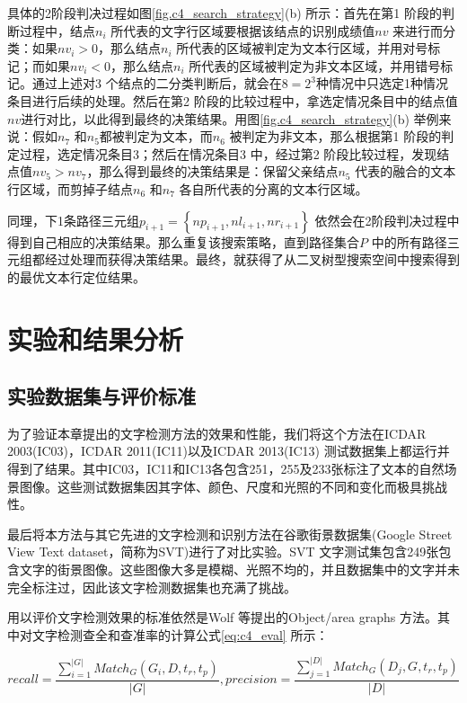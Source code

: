         具体的2阶段判决过程如图\ref{fig.c4_search_strategy}(b) 所示：首先在第1 阶段的判断过程中，结点$n_i$ 所代表的文字行区域要根据该结点的识别成绩值$nv$ 来进行而分类：如果$nv_i>0$，那么结点$n_i$ 所代表的区域被判定为文本行区域，并用对号标记；而如果$nv_i<0$，那么结点$n_i$ 所代表的区域被判定为非文本区域，并用错号标记。通过上述对3 个结点的二分类判断后，就会在$8=2^3$种情况中只选定1种情况条目进行后续的处理。然后在第2 阶段的比较过程中，拿选定情况条目中的结点值$nv$进行对比，以此得到最终的决策结果。用图\ref{fig.c4_search_strategy}(b) 举例来说：假如$n_7$ 和$n_5$都被判定为文本，而$n_6$ 被判定为非文本，那么根据第1 阶段的判定过程，选定情况条目3；然后在情况条目3 中，经过第2 阶段比较过程，发现结点值$nv_5>nv_7$，那么得到最终的决策结果是：保留父亲结点$n_5$ 代表的融合的文本行区域，而剪掉子结点$n_6$ 和$n_7$ 各自所代表的分离的文本行区域。

        同理，下1条路径三元组$p_{i+1}=\left\{np_{i+1},nl_{i+1},nr_{i+1}\right\}$ 依然会在2阶段判决过程中得到自己相应的决策结果。那么重复该搜索策略，直到路径集合$P$ 中的所有路径三元组都经过处理而获得决策结果。最终，就获得了从二叉树型搜索空间中搜索得到的最优文本行定位结果。

    \section{实验和结果分析}

        \subsection{实验数据集与评价标准}

        为了验证本章提出的文字检测方法的效果和性能，我们将这个方法在ICDAR 2003(IC03)，ICDAR 2011(IC11)以及ICDAR 2013(IC13) 测试数据集上都运行并得到了结果。其中IC03，IC11和IC13各包含251，255及233张标注了文本的自然场景图像。这些测试数据集因其字体、颜色、尺度和光照的不同和变化而极具挑战性。

        最后将本方法与其它先进的文字检测和识别方法在谷歌街景数据集(Google Street View Text dataset，简称为SVT)进行了对比实验。SVT 文字测试集包含249张包含文字的街景图像。这些图像大多是模糊、光照不均的，并且数据集中的文字并未完全标注过，因此该文字检测数据集也充满了挑战。

        用以评价文字检测效果的标准依然是Wolf 等\cite{Wolf2006Object}提出的Object/area graphs 方法。其中对文字检测查全和查准率的计算公式\ref{eq:c4_eval} 所示：

        \begin{equation}
        recall = \frac {\sum_{i=1}^{|G|}Match_G(G_i,D,t_r,t_p)} {|G|}  ,   
        precision =\frac {\sum_{j=1}^{|D|}Match_G(D_j,G,t_r,t_p)} {|D|}
        \label{eq:c4_eval}
        \end{equation}

